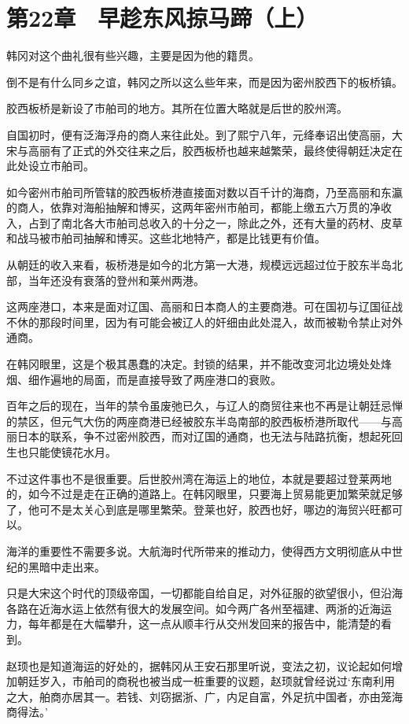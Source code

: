 \section{第22章　早趁东风掠马蹄（上）}

韩冈对这个曲礼很有些兴趣，主要是因为他的籍贯。

倒不是有什么同乡之谊，韩冈之所以这么些年来，而是因为密州胶西下的板桥镇。

胶西板桥是新设了市舶司的地方。其所在位置大略就是后世的胶州湾。

自国初时，便有泛海浮舟的商人来往此处。到了熙宁八年，元绛奉诏出使高丽，大宋与高丽有了正式的外交往来之后，胶西板桥也越来越繁荣，最终使得朝廷决定在此处设立市舶司。

如今密州市舶司所管辖的胶西板桥港直接面对数以百千计的海商，乃至高丽和东瀛的商人，依靠对海船抽解和博买，这两年密州市舶司，都能上缴五六万贯的净收入，占到了南北各大市舶司总收入的十分之一，除此之外，还有大量的药材、皮草和战马被市舶司抽解和博买。这些北地特产，都是比钱更有价值。

从朝廷的收入来看，板桥港是如今的北方第一大港，规模远远超过位于胶东半岛北部，当年还没有衰落的登州和莱州两港。

这两座港口，本来是面对辽国、高丽和日本商人的主要商港。可在国初与辽国征战不休的那段时间里，因为有可能会被辽人的奸细由此处混入，故而被勒令禁止对外通商。

在韩冈眼里，这是个极其愚蠢的决定。封锁的结果，并不能改变河北边境处处烽烟、细作遍地的局面，而是直接导致了两座港口的衰败。

百年之后的现在，当年的禁令虽废弛已久，与辽人的商贸往来也不再是让朝廷忌惮的禁区，但元气大伤的两座商港已经被胶东半岛南部的胶西板桥港所取代——与高丽日本的联系，争不过密州胶西，而对辽国的通商，也无法与陆路抗衡，想起死回生也只能使镜花水月。

不过这件事也不是很重要。后世胶州湾在海运上的地位，本就是要超过登莱两地的，如今不过是走在正确的道路上。在韩冈眼里，只要海上贸易能更加繁荣就足够了，他可不是太关心到底是哪里繁荣。登莱也好，胶西也好，哪边的海贸兴旺都可以。

海洋的重要性不需要多说。大航海时代所带来的推动力，使得西方文明彻底从中世纪的黑暗中走出来。

只是大宋这个时代的顶级帝国，一切都能自给自足，对外征服的欲望很小，但沿海各路在近海水运上依然有很大的发展空间。如今两广各州至福建、两浙的近海运力，每年都是在大幅攀升，这一点从顺丰行从交州发回来的报告中，能清楚的看到。

赵顼也是知道海运的好处的，据韩冈从王安石那里听说，变法之初，议论起如何增加朝廷岁入，市舶司的商税也被当成一桩重要的议题，赵顼就曾经说过‘东南利用之大，舶商亦居其一。若钱、刘窃据浙、广，内足自富，外足抗中国者，亦由笼海商得法。’

